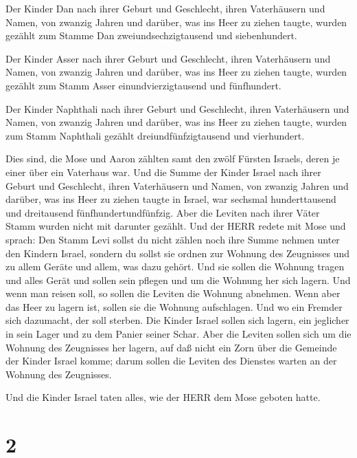  Der Kinder Dan nach ihrer Geburt und Geschlecht, ihren
Vaterhäusern und Namen, von zwanzig Jahren und darüber, was ins Heer zu
ziehen taugte,  wurden gezählt zum Stamme Dan
zweiundsechzigtausend und siebenhundert.

 Der Kinder Asser nach ihrer Geburt und Geschlecht, ihren
Vaterhäusern und Namen, von zwanzig Jahren und darüber, was ins Heer zu
ziehen taugte,  wurden gezählt zum Stamm Asser
einundvierzigtausend und fünfhundert.

 Der Kinder Naphthali nach ihrer Geburt und Geschlecht,
ihren Vaterhäusern und Namen, von zwanzig Jahren und darüber, was ins
Heer zu ziehen taugte,  wurden zum Stamm Naphthali gezählt
dreiundfünfzigtausend und vierhundert.

 Dies sind, die Mose und Aaron zählten samt den zwölf
Fürsten Israels, deren je einer über ein Vaterhaus war. 
Und die Summe der Kinder Israel nach ihrer Geburt und Geschlecht, ihren
Vaterhäusern und Namen, von zwanzig Jahren und darüber, was ins Heer zu
ziehen taugte in Israel,  war sechsmal hunderttausend und
dreitausend fünfhundertundfünfzig.  Aber die Leviten nach
ihrer Väter Stamm wurden nicht mit darunter gezählt.  Und
der HERR redete mit Mose und sprach:  Den Stamm Levi sollst
du nicht zählen noch ihre Summe nehmen unter den Kindern Israel,
 sondern du sollst sie ordnen zur Wohnung des Zeugnisses
und zu allem Geräte und allem, was dazu gehört. Und sie sollen die
Wohnung tragen und alles Gerät und sollen sein pflegen und um die
Wohnung her sich lagern.  Und wenn man reisen soll, so
sollen die Leviten die Wohnung abnehmen. Wenn aber das Heer zu lagern
ist, sollen sie die Wohnung aufschlagen. Und wo ein Fremder sich
dazumacht, der soll sterben.  Die Kinder Israel sollen sich
lagern, ein jeglicher in sein Lager und zu dem Panier seiner Schar.
 Aber die Leviten sollen sich um die Wohnung des Zeugnisses
her lagern, auf daß nicht ein Zorn über die Gemeinde der Kinder Israel
komme; darum sollen die Leviten des Dienstes warten an der Wohnung des
Zeugnisses.

 Und die Kinder Israel taten alles, wie der HERR dem Mose
geboten hatte.

\hypertarget{section-1}{%
\section{2}\label{section-1}}

